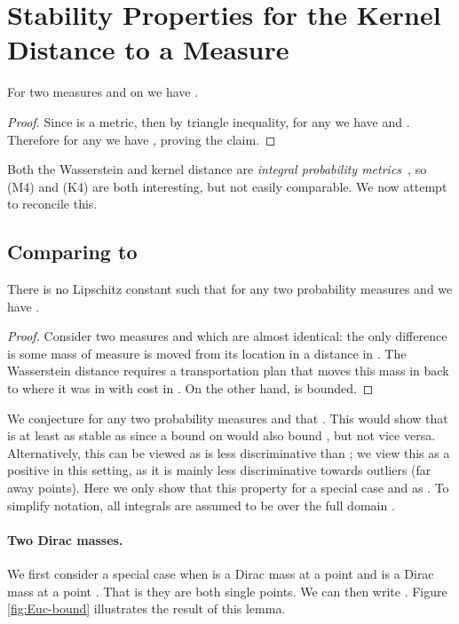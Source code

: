 \documentclass[11pt]{myclass}
\begin{document}
\section{Stability Properties for the Kernel Distance to a Measure}

\begin{lemma}[K4]
For two measures  and  on  we have
. 
\end{lemma}
\begin{proof}
Since  is a metric, then by triangle inequality,  for any  we have 
 and 
. 
Therefore for any  we have , proving the claim.  
\end{proof}

Both the Wasserstein and kernel distance are \emph{integral probability metrics}~\cite{SGFSL10}, so (M4) and (K4) are both interesting, but not easily comparable.  We now attempt to reconcile this.  

\subsection{Comparing  to }
\begin{lemma}
There is no Lipschitz constant  such that for any two probability measures  and  we have .  
\end{lemma}
\begin{proof}
Consider two measures  and  which are almost identical: the only difference is some mass of measure  is moved from its location in  a distance  in . 
The Wasserstein distance requires a transportation plan that moves this  mass in  back to where it was in  with cost  in .  
On the other hand,   is bounded.  
\end{proof}

We conjecture for any two probability measures  and  that .  This would show that  is at least as stable as  since a bound on  would also bound , but not vice versa.  
Alternatively, this can be viewed as  is less discriminative than ; we view this as a positive in this setting, as it is mainly less discriminative towards outliers (far away points).  
Here we only show that this property for a special case and as .  
To simplify notation, all integrals are assumed to be over the full domain .  

\paragraph{Two Dirac masses.}
We first consider a special case when  is a Dirac mass at a point  and  is a Dirac mass at a point .  That is they are both single points.  We can then write .  Figure \ref{fig:Euc-bound} illustrates the result of this lemma.  
\end{document}
